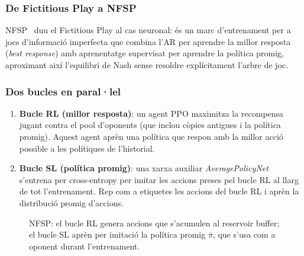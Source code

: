\subsubsection*{De Fictitious Play a NFSP}

\ac{NFSP}~\cite{heinrich2016nfsp} duu el Fictitious Play al cas neuronal: és un
marc d'entrenament per a jocs d'informació imperfecta que combina l'\ac{AR} per
aprendre la millor resposta (\emph{best response}) amb aprenentatge supervisat
per aprendre la política promig, aproximant així l'equilibri de Nash sense
resoldre explícitament l'arbre de joc.

\subsubsection*{Dos bucles en paral·lel}

\begin{enumerate}
  \item \textbf{Bucle RL (millor resposta)}: un agent PPO maximitza la
        recompensa jugant contra el pool d'oponents (que inclou còpies antigues
        i la política promig). Aquest agent aprèn una política que
        respon amb la millor acció possible a les polítiques de l'historial.

  \item \textbf{Bucle SL (política promig)}: una xarxa auxiliar
        \emph{AveragePolicyNet} s'entrena per cross-entropy per imitar les
        accions preses pel bucle RL al llarg de tot l'entrenament. Rep com a
        etiquetes les accions del bucle RL i aprèn la distribució promig
        d'accions.
\end{enumerate}

\begin{figure}[H]
  \centering
  \caption[Cicle d'entrenament \acs{NFSP}.]{\acs{NFSP}: el bucle RL genera accions que s'acumulen al reservoir buffer; el bucle SL aprèn per imitació la política promig $\overline{\pi}$, que s'usa com a oponent durant l'entrenament.}\label{fig:nfsp}
\end{figure}


